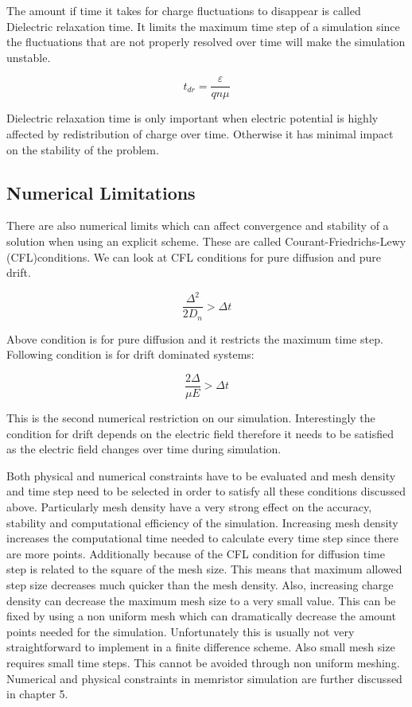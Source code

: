\begin{doublespace}
The amount if time it takes for charge fluctuations to disappear is called Dielectric relaxation time. It limits the maximum time step of a simulation since the fluctuations that are not properly resolved over time will make the simulation unstable.

\begin{equation}
t_{dr}=\frac{\varepsilon}{q n \mu}
\label{tdr}
\end{equation}

Dielectric relaxation time is only important when electric potential is highly affected by redistribution of charge over time. Otherwise it has minimal impact on the stability of the problem.
\subsection{Numerical Limitations}

There are also numerical limits which can affect convergence and stability of a solution when using an explicit scheme. These are called Courant-Friedrichs-Lewy (CFL)conditions. We can look at CFL conditions for pure diffusion and pure drift.

\begin{equation}
\frac{\Delta ^2}{2 D_n}>\Delta t
\label{CFL_Diff}
\end{equation}

Above condition is for pure diffusion and it restricts the maximum time step. Following condition is for drift dominated systems:

\begin{equation}
\frac{2 \Delta }{\mu E}>\Delta t
\label{CFL_Drift}
\end{equation}

This is the second numerical restriction on our simulation. Interestingly the condition for drift depends on the electric field therefore it needs to be satisfied as the electric field changes over time during simulation.

Both physical and numerical constraints have to be evaluated and mesh density and time step need to be selected in order to satisfy all these conditions discussed above. Particularly mesh density have a very strong effect on the accuracy, stability and computational efficiency of the simulation. Increasing mesh density increases the computational time needed to calculate every time step since there are more points. Additionally because of the CFL condition for diffusion time step is related to the square of the mesh size. This means that maximum allowed step size decreases much quicker than the mesh density. Also, increasing charge density can decrease the maximum mesh size to a very small value. This can be fixed by using a non uniform mesh which can dramatically decrease the amount points needed for the simulation. Unfortunately this is usually not very straightforward to implement in a finite difference scheme. Also small mesh size requires small time steps. This cannot be avoided through non uniform meshing. Numerical and physical constraints in memristor simulation are further discussed in chapter 5.


\end{doublespace}
